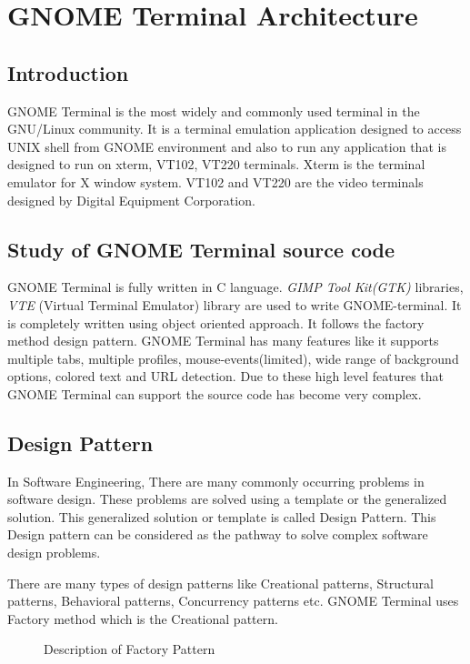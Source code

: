 \chapter{GNOME Terminal Architecture}
\section{Introduction}
GNOME Terminal is the most widely and commonly used terminal in the GNU/Linux community. It is a terminal emulation application designed to access UNIX shell from GNOME environment and also to run any application that is designed to run on xterm, VT102, VT220 terminals. Xterm is the terminal emulator for X window system. VT102 and VT220 are the video terminals designed by Digital Equipment Corporation.

\section{Study of GNOME Terminal source code}
GNOME Terminal is fully written in C language. \textit{GIMP Tool Kit(GTK)} libraries, \textit{VTE} (Virtual Terminal Emulator) library are used to write GNOME-terminal. It is completely written using object oriented approach. It follows the factory method design pattern. GNOME Terminal has many features like it supports multiple tabs, multiple profiles, mouse-events(limited), wide range of background options, colored text and URL detection. Due to these  high level features that GNOME Terminal can support the source code has become very complex.

\section{Design Pattern}
In Software Engineering, There are many commonly occurring problems in software design. These problems are solved using a template or the generalized solution. This generalized solution or template is called Design Pattern. This Design pattern can be considered as the pathway to solve complex software design problems.

There are many types of design patterns like Creational patterns, Structural patterns, Behavioral patterns, Concurrency patterns etc. GNOME Terminal uses Factory method which is the Creational pattern.

\begin{figure}[htbp]
\centerline{}
\caption{Description of Factory Pattern} \label{Gnome Terminal13}
\end{figure}

